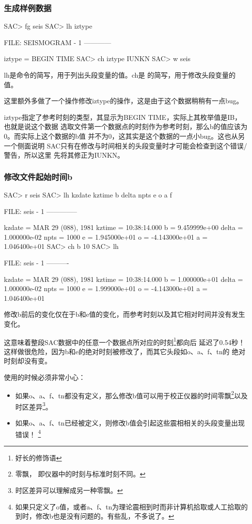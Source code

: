 \subsubsection{生成样例数据}
\begin{SACCode}
SAC> fg seis
SAC> lh iztype

  FILE: SEISMOGRAM - 1
   ------------

    iztype = BEGIN TIME
SAC> ch iztype IUNKN
SAC> w seis
\end{SACCode}
lh是命令的简写，用于列出头段变量的值。ch是
的简写，用于修改头段变量的值。

这里额外多做了一个操作修改iztype的操作，这是由于这个数据稍稍有一点bug。

iztype指定了参考时刻的类型，其显示为BEGIN TIME，实际上其枚举值是IB，也就是说这个数据
选取文件第一个数据点的时刻作为参考时刻，那么b的值应该为0。而实际上这个数据的b值
并不为0，这其实是这个数据的一点小bug。这也从另一个侧面说明
SAC只有在修改与时间相关的头段变量时才可能会检查到这个错误/警告，所以这里
先将其修正为IUNKN。

\subsubsection{修改文件起始时间b}
\begin{SACCode}
SAC> r seis
SAC> lh kzdate kztime b delta npts e o a f
  
  FILE: seis - 1
 --------------

     kzdate = MAR 29 (088), 1981
     kztime = 10:38:14.000
          b = 9.459999e+00
      delta = 1.000000e-02
       npts = 1000
          e = 1.945000e+01
          o = -4.143000e+01
          a = 1.046400e+01
SAC> ch b 10
SAC> lh
  
  FILE: seis - 1
   ----------

     kzdate = MAR 29 (088), 1981
     kztime = 10:38:14.000
          b = 1.000000e+01
      delta = 1.000000e-02
       npts = 1000
          e = 1.999000e+01
          o = -4.143000e+01
          a = 1.046400e+01
\end{SACCode}

修改b前后的变化仅在于b和e值的变化，而参考时刻以及其它相对时间并没有发生变化。

这意味着整段SAC数据中的任意一个数据点所对应的时刻\footnote{好长的修饰语}都向后
延迟了0.54秒！这样做很危险，因为b和e的绝对时刻被修改了，而其它头段如o、a、f、tn的
绝对时刻却没有变。

使用的时候必须非常小心：
\begin{itemize}
\item 如果o、a、f、tn都没有定义，那么修改b值可以用于校正仪器的时间零飘\footnote{零飘，
    即仪器中的时刻与标准时刻不同。}以及时区差异\footnote{时区差异可以理解成另一种零飘。}。
\item 如果o、a、f、tn已经被定义，则修改b值会引起这些震相相关的头段变量出现错误！
    \footnote{如果只定义了o值，或者a、f、tn为理论震相到时而非计算机拾取或人工拾取的
    到时，修改b也是没有问题的。有些乱，不多说了。}
\end{itemize}

